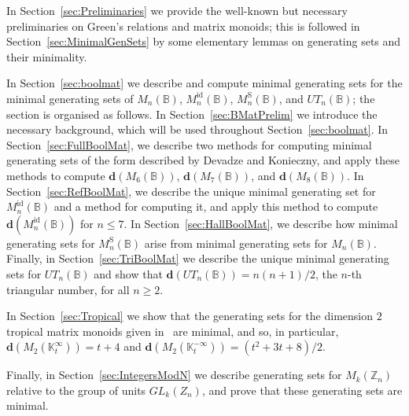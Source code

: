 \documentclass[11pt]{article}
\numberwithin{equation}{section}
\newcommand{\B}{\mathbb{B}}
\newcommand{\Bn}{M_n(\B)}
\newcommand{\Refln}{M_n^{\text{id}}(\B)}
\newcommand{\Halln}{M_n^{\text{S}}(\B)}
\newcommand{\UTn}{UT_n(\B)}
\newcommand{\Z}{\mathbb{Z}}
\renewcommand{\d}{\mathbf{d}}
\newcommand{\K}{\mathbb{K}}
\newcommand{\Kmint}{\K^{\infty}_t}
\newcommand{\Kmaxt}{\K^{-\infty}_t}
\begin{document}
In Section~\ref{sec:Preliminaries} we provide the well-known but necessary
preliminaries on Green's relations and matrix monoids; this is followed in
Section~\ref{sec:MinimalGenSets} by some elementary lemmas on generating sets
and their minimality.

In Section~\ref{sec:boolmat} we describe and compute minimal generating sets for
the minimal generating sets of $\Bn$, $\Refln$, $\Halln$, and $\UTn$;
the section is organised as follows. In Section~\ref{sec:BMatPrelim} we
introduce the necessary background, which will be used throughout
Section~\ref{sec:boolmat}. In Section~\ref{sec:FullBoolMat}, we describe two
methods for computing minimal generating sets of the form described by Devadze
and Konieczny, and apply these methods to compute $\d(M_6(\B))$, $\d(M_7(\B))$,
and $\d(M_8(\B))$. In Section~\ref{sec:RefBoolMat}, we describe the unique
minimal generating set for $\Refln$ and a method for computing it, and apply
this method to compute $\d(\Refln)$ for $n \leq 7$. In
Section~\ref{sec:HallBoolMat}, we describe how minimal generating sets for
$\Halln$ arise from minimal generating sets for $\Bn$. Finally, in
Section~\ref{sec:TriBoolMat} we describe the unique minimal generating sets for
$\UTn$ and show that $\d(\UTn) = n(n+1)/2$, the $n$-th triangular number, for all
$n \geq 2$.

In Section~\ref{sec:Tropical} we show that the generating sets for the dimension
$2$ tropical matrix monoids given in~\cite{East2020aa} are minimal, and so, in
particular, $\d(M_2(\Kmint)) = t + 4$ and $\d(M_2(\Kmaxt)) = (t^2 + 3t + 8)/2$.

Finally, in Section~\ref{sec:IntegersModN} we describe generating sets for
$M_k(\Z_n)$ relative to the group of units $GL_k(Z_n)$, and prove that these
generating sets are minimal.

\end{document}
